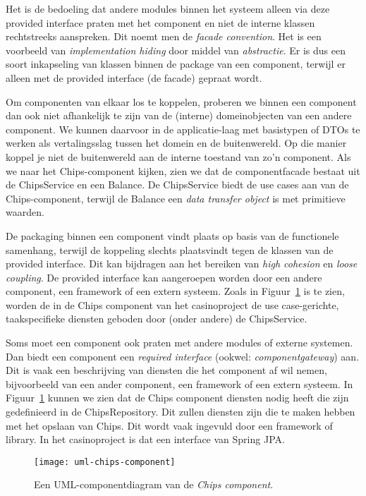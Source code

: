 Het is de bedoeling dat andere modules binnen het systeem alleen via deze 
provided interface praten met het component en niet de interne klassen rechtstreeks aanspreken.
Dit noemt men de \textit{facade convention}.
Het is een voorbeeld van \emph{implementation hiding} door middel van \emph{abstractie}.
Er is dus een soort inkapseling van klassen binnen de package van een component,
terwijl er alleen met de provided interface (de facade) gepraat wordt.

Om componenten van elkaar los te koppelen, proberen we binnen een component 
dan ook niet afhankelijk te zijn van de (interne) domeinobjecten van een andere component.
We kunnen daarvoor in de applicatie-laag met basistypen of DTOs te werken als vertalingsslag tussen 
het domein en de buitenwereld. Op die manier koppel je niet de buitenwereld aan de 
interne toestand van zo'n component. Als we naar het Chips-component kijken, 
zien we dat de componentfacade bestaat uit de ChipsService en een Balance. De ChipsService biedt 
de use cases aan van de Chips-component, terwijl de Balance een \emph{data transfer object} is 
met primitieve waarden.

De packaging binnen een component vindt plaats op basis van de functionele samenhang,
terwijl de koppeling slechts plaatsvindt tegen de klassen van de provided interface.
Dit kan bijdragen aan het bereiken van \emph{high cohesion} en \emph{loose coupling}.
De provided interface kan aangeroepen worden door een andere component,
een framework of een extern systeem. 
Zoals in Figuur~\ref{fig:uml-chips-component} is te zien,
worden de in de Chips component van het casinoproject de use case-gerichte,
taakspecifieke diensten geboden door (onder andere) de ChipsService.

Soms moet een component ook praten met andere modules of externe systemen. 
Dan biedt een component een \emph{required interface} (ookwel: \emph{componentgateway}) aan.
Dit is vaak een beschrijving van diensten die het component af wil nemen,
bijvoorbeeld van een ander component, een framework of een extern systeem.
In Figuur~\ref{fig:uml-chips-component} kunnen we zien dat de Chips component
diensten nodig heeft die zijn gedefinieerd in de ChipsRepository. Dit zullen diensten
zijn die te maken hebben met het opslaan van Chips. Dit wordt vaak ingevuld door een 
framework of library. In het casinoproject is dat een interface van Spring JPA.

\begin{figure}[H]
    \centering
    \texttt{[image: uml-chips-component]}
    \caption{Een UML-componentdiagram van de \emph{Chips component}.}
    \label{fig:uml-chips-component}
\end{figure}

